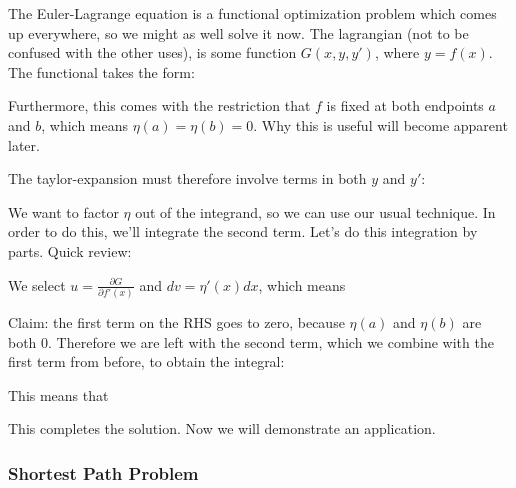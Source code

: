 \documentclass[12pt]{article}
\begin{document}
The Euler-Lagrange equation is a functional optimization problem which comes up everywhere, so we might as well solve it now. The lagrangian (not to be confused with the other uses), is some function $G(x, y, y')$, where $y = f(x)$. The functional takes the form:


Furthermore, this comes with the restriction that $f$ is fixed at both endpoints $a$ and $b$, which means $\eta(a) = \eta(b) = 0$. Why this is useful will become apparent later.

The taylor-expansion must therefore involve terms in both $y$ and $y'$:


We want to factor $\eta$ out of the integrand, so we can use our usual technique. In order to do this, we'll integrate the second term. Let's do this integration by parts. Quick review:


We select $u = \frac{\partial G}{\partial f'(x)}$ and $dv = \eta'(x) dx$, which means



Claim: the first term on the RHS goes to zero, because $\eta(a)$ and $\eta(b)$ are both 0. Therefore we are left with the second term, which we combine with the first term from before, to obtain the integral:


This means that


This completes the solution. Now we will demonstrate an application.

\subsubsection{Shortest Path Problem}
\end{document}

